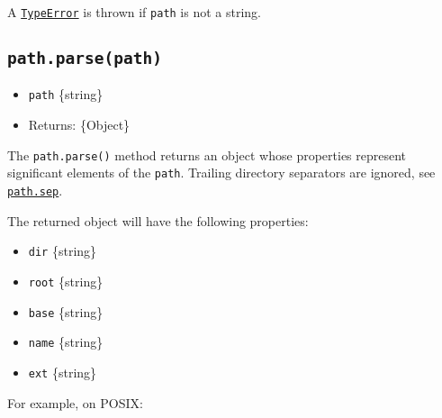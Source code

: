 A \href{errors.md\#class-typeerror}{\texttt{TypeError}} is thrown if
\texttt{path} is not a string.

\subsection{\texorpdfstring{\texttt{path.parse(path)}}{path.parse(path)}}\label{path.parsepath}

\begin{itemize}
\tightlist
\item
  \texttt{path} \{string\}
\item
  Returns: \{Object\}
\end{itemize}

The \texttt{path.parse()} method returns an object whose properties
represent significant elements of the \texttt{path}. Trailing directory
separators are ignored, see \hyperref[pathsep]{\texttt{path.sep}}.

The returned object will have the following properties:

\begin{itemize}
\tightlist
\item
  \texttt{dir} \{string\}
\item
  \texttt{root} \{string\}
\item
  \texttt{base} \{string\}
\item
  \texttt{name} \{string\}
\item
  \texttt{ext} \{string\}
\end{itemize}

For example, on POSIX:

\begin{Shaded}
\begin{Highlighting}[]
\NormalTok{(}\NormalTok{)}\OperatorTok{;}
\end{Highlighting}
\end{Shaded}

\begin{Shaded}
\begin{Highlighting}[]
\end{Highlighting}
\end{Shaded}

